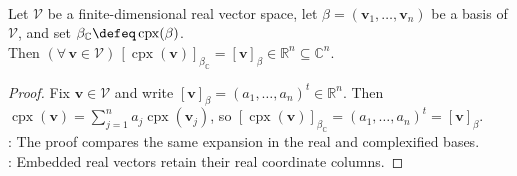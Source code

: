 \begin{corollary} \label{cor:complexification-coordinate-compatibility} \\
Let $\mathcal{V}$ be a finite-dimensional real vector space, let $\beta=(\mathbf{v}_1,\ldots,\mathbf{v}_n)$ be a basis of $\mathcal{V}$, and set $\beta_{\mathbb{C}}\defeq\operatorname{cpx}(\beta)$.\\
Then $(\forall\,\mathbf{v}\in\mathcal{V})\,[\operatorname{cpx}(\mathbf{v})]_{\beta_{\mathbb{C}}}=[\mathbf{v}]_{\beta}\in\mathbb{R}^n\subseteq\mathbb{C}^n$.
\begin{proof}
Fix $\mathbf{v}\in\mathcal{V}$ and write $[\mathbf{v}]_{\beta}=(a_1,\ldots,a_n)^t\in\mathbb{R}^n$. Then $\operatorname{cpx}(\mathbf{v})=\sum\limits_{j=1}^{n}a_j\operatorname{cpx}(\mathbf{v}_j)$, so $[\operatorname{cpx}(\mathbf{v})]_{\beta_{\mathbb{C}}}=(a_1,\ldots,a_n)^t=[\mathbf{v}]_{\beta}$.\\
: The proof compares the same expansion in the real and complexified bases.\\
: Embedded real vectors retain their real coordinate columns.
\end{proof}
\end{corollary}

